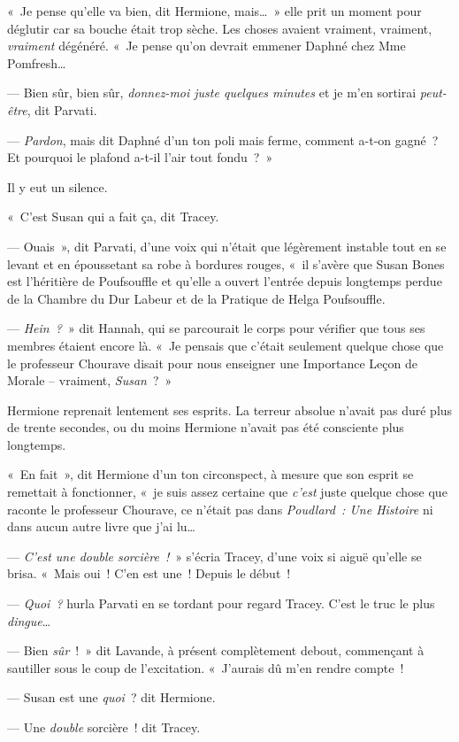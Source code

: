 «~Je pense qu'elle va bien, dit Hermione, mais…~»
elle prit un moment pour déglutir car sa bouche était trop sèche.
Les choses avaient vraiment, vraiment, \emph{vraiment} dégénéré.
«~Je pense qu'on devrait emmener Daphné chez Mme Pomfresh…

--- Bien sûr, bien sûr, \emph{donnez-moi juste quelques minutes} et je m'en sortirai \emph{peut-être}, dit Parvati.

--- \emph{Pardon}, mais dit Daphné d'un ton poli mais ferme, comment a-t-on gagné~?
Et pourquoi le plafond a-t-il l'air tout fondu~?~»

Il y eut un silence.

«~C'est Susan qui a fait ça, dit Tracey.

--- Ouais~», dit Parvati, d'une voix qui n'était que légèrement instable tout en se levant et en époussetant sa robe à bordures rouges, «~il s'avère que Susan Bones est l'héritière de Poufsouffle et qu'elle a ouvert l'entrée depuis longtemps perdue de la Chambre du Dur Labeur et de la Pratique de Helga Poufsouffle.

--- \emph{Hein~?}~» dit Hannah, qui se parcourait le corps pour vérifier que tous ses membres étaient encore là.
«~Je pensais que c'était seulement quelque chose que le professeur Chourave disait pour nous enseigner une Importance Leçon de Morale -- vraiment, \emph{Susan}~?~»

Hermione reprenait lentement ses esprits.
La terreur absolue n'avait pas duré plus de trente secondes, ou du moins Hermione n'avait pas été consciente plus longtemps.

«~En fait~», dit Hermione d'un ton circonspect, à mesure que son esprit se remettait à fonctionner, «~je suis assez certaine que \emph{c'est} juste quelque chose que raconte le professeur Chourave, ce n'était pas dans \emph{Poudlard~: Une Histoire} ni dans aucun autre livre que j'ai lu…

--- \emph{C'est une double sorcière~!}~» s'écria Tracey, d'une voix si aiguë qu'elle se brisa.
«~Mais oui~!
C'en est une~!
Depuis le début~!

--- \emph{Quoi~?} hurla Parvati en se tordant pour regard Tracey.
C'est le truc le plus \emph{dingue}…

--- Bien \emph{sûr}~!~»
dit Lavande, à présent complètement debout, commençant à sautiller sous le coup de l'excitation.
«~J'aurais dû m'en rendre compte~!

--- Susan est une \emph{quoi}~? dit Hermione.

--- Une \emph{double} sorcière~! dit Tracey.

